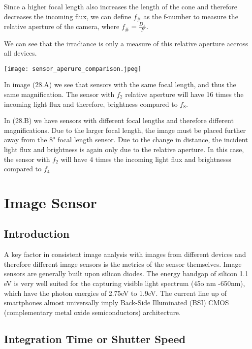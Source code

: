 \documentclass{article}
\begin{document}
Since a higher focal length also increases the length of
the cone and therefore decreases the incoming flux, we can define $ f_{\#}$ as the f-number
to measure the relative aperture of the camera, where $ f_{\#} = \frac{D_A}{F}$.

We can see that the irradiance is only a measure of this relative aperture accross all devices.

\begin{center}
  \texttt{[image: sensor\_aperure\_comparison.jpeg]}
\end{center}


In image (28.A) we see that sensors with the same focal length, and thus the same magnification.
The sensor with  $f_2$ relative aperture will have 16 times the incoming light flux and therefore,
brightness compared to $f_8$.

In (28.B) we have sensors with different focal lengths and therefore different magnifications.
Due to the larger focal length, the image must be placed further away from the 8" focal length sensor.
Due to the change in distance, the incident light flux and brightness is again only due to
the relative aperture. In this case, the sensor with $ f_2$ will have 4 times the incoming light flux
and brightnesss compared to $ f_4$

\section{Image Sensor}

\subsection{Introduction}

A key factor in consistent image analysis with images from different devices
and therefore different image sensors is the metrics of the sensor themselves.
Image sensors are generally built upon silicon diodes. The energy bandgap
of silicon 1.1 eV is very well suited for the capturing visible light spectrum (45o nm -650nm), which
have the photon energies of 2.75eV to 1.9eV. The current line up of smartphones almost universally imply
Back-Side Illuminated (BSI)
CMOS
 (complementary metal oxide semiconductors) architecture.


\subsection{Integration Time or Shutter Speed}
\end{document}
